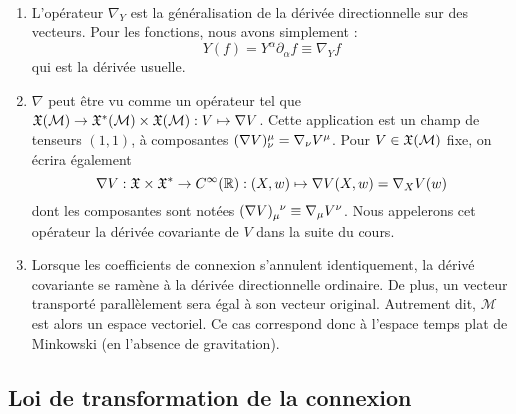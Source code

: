 \begin{rmk} \,\\
\begin{enumerate}
    \item L'opérateur $\nabla_{Y}$ est la généralisation de la dérivée directionnelle sur des vecteurs. Pour les fonctions, nous avons simplement :
    \begin{equation}
        Y(f) = Y^{\alpha}\partial_{\alpha} f \equiv \nabla_{Y}f
    \end{equation}
    qui est la dérivée usuelle.
    \item $\nabla$ peut être vu comme un opérateur tel que
    $\mathfrak{X} (\mathcal{M})\to \mathfrak{X}^* (\mathcal{M})\times\mathfrak{X}(\mathcal{M}):V \mapsto \nabla V$. Cette application est un champ de tenseurs $(1, 1)$, à composantes $(\nabla V)\indices*{^\mu_\nu} = \nabla_\nu V^\mu$. Pour $V\in\mathfrak{X} (\mathcal{M})$ fixe, on écrira également
    \begin{equation}
        \nabla V: \mathfrak{X} \times \mathfrak{X}^* \to C^\infty(\mathbb{R}): (X,w) \mapsto \nabla V(X,w) = \nabla_X V(w)
    \end{equation}
    dont les composantes sont notées $(\nabla V)\indices{_\mu^\nu} \equiv \nabla_\mu V^\nu$. Nous appelerons cet opérateur la dérivée covariante de $V$ dans la suite du cours.
    \item Lorsque les coefficients de connexion s'annulent identiquement, la dérivé covariante se ramène à la dérivée directionnelle ordinaire. De plus, un vecteur transporté parallèlement sera égal à son vecteur original. Autrement dit, $\mathcal{M}$ est alors un espace vectoriel. Ce cas correspond donc à l'espace temps plat de Minkowski (en l'absence de gravitation).
\end{enumerate}
\end{rmk}
\cutebreak
\subsection{Loi de transformation de la connexion}

